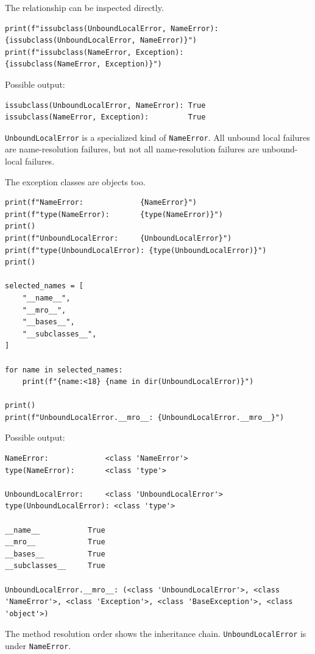 The relationship can be inspected directly.

\begin{verbatim}
print(f"issubclass(UnboundLocalError, NameError): {issubclass(UnboundLocalError, NameError)}")
print(f"issubclass(NameError, Exception):         {issubclass(NameError, Exception)}")
\end{verbatim}

Possible output:

\begin{verbatim}
issubclass(UnboundLocalError, NameError): True
issubclass(NameError, Exception):         True
\end{verbatim}

\texttt{UnboundLocalError} is a specialized kind of \texttt{NameError}. All unbound local failures are name-resolution failures, but not all name-resolution failures are unbound-local failures.

The exception classes are objects too.

\begin{verbatim}
print(f"NameError:             {NameError}")
print(f"type(NameError):       {type(NameError)}")
print()
print(f"UnboundLocalError:     {UnboundLocalError}")
print(f"type(UnboundLocalError): {type(UnboundLocalError)}")
print()

selected_names = [
    "__name__",
    "__mro__",
    "__bases__",
    "__subclasses__",
]

for name in selected_names:
    print(f"{name:<18} {name in dir(UnboundLocalError)}")

print()
print(f"UnboundLocalError.__mro__: {UnboundLocalError.__mro__}")
\end{verbatim}

Possible output:

\begin{verbatim}
NameError:             <class 'NameError'>
type(NameError):       <class 'type'>

UnboundLocalError:     <class 'UnboundLocalError'>
type(UnboundLocalError): <class 'type'>

__name__           True
__mro__            True
__bases__          True
__subclasses__     True

UnboundLocalError.__mro__: (<class 'UnboundLocalError'>, <class 'NameError'>, <class 'Exception'>, <class 'BaseException'>, <class 'object'>)
\end{verbatim}

The method resolution order shows the inheritance chain. \texttt{UnboundLocalError} is under \texttt{NameError}.

